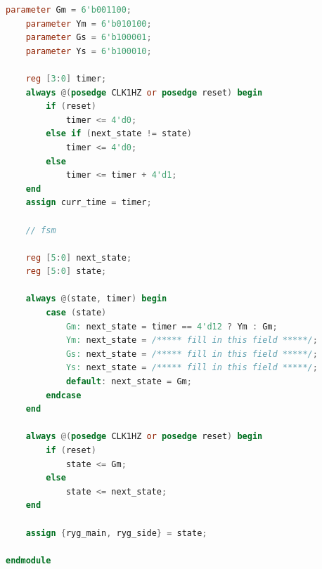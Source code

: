 \documentclass{ctexart}
\begin{document}
\begin{lstlisting}[language=Verilog]
    parameter Gm = 6'b001100;
    parameter Ym = 6'b010100;
    parameter Gs = 6'b100001;
    parameter Ys = 6'b100010;

    reg [3:0] timer;
    always @(posedge CLK1HZ or posedge reset) begin
        if (reset)
            timer <= 4'd0;
        else if (next_state != state)
            timer <= 4'd0;
        else
            timer <= timer + 4'd1;
    end
    assign curr_time = timer;

    // fsm
    
    reg [5:0] next_state;
    reg [5:0] state;
    
    always @(state, timer) begin
        case (state)
            Gm: next_state = timer == 4'd12 ? Ym : Gm;
            Ym: next_state = /***** fill in this field *****/;
            Gs: next_state = /***** fill in this field *****/;
            Ys: next_state = /***** fill in this field *****/;
            default: next_state = Gm;
        endcase
    end

    always @(posedge CLK1HZ or posedge reset) begin
        if (reset)
            state <= Gm;
        else
            state <= next_state;
    end

    assign {ryg_main, ryg_side} = state;

endmodule
\end{lstlisting}
\end{document}
